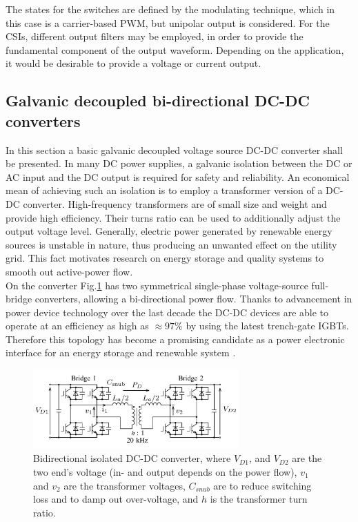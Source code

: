 The states for the switches are defined by the modulating technique, which in this case is a carrier-based PWM, but unipolar output is considered. For the CSIs, different output filters may be employed, in order to provide the fundamental component of the output waveform. Depending on the application, it would be desirable to provide a voltage or current output.

\subsection{Galvanic decoupled bi-directional DC-DC converters}\label{BASICCSR:sec:DCDC}

In this section a basic galvanic decoupled voltage source DC-DC converter shall be presented. In many DC power supplies, a galvanic isolation between the DC or AC input and the DC output is required for safety and reliability. An economical mean of achieving such an isolation is to employ a transformer version of a DC-DC converter. High-frequency transformers are of small size and weight and provide high efficiency. Their turns ratio can be used to additionally adjust the output voltage level. Generally, electric power generated by renewable energy sources is unstable in nature, thus producing an unwanted effect on the utility grid. This fact motivates research on energy storage and quality systems to smooth out active-power flow.\\
On the converter Fig.\ref{BASICCSR:fig:DCDCGalvanic} has two symmetrical single-phase voltage-source full-bridge converters, allowing a bi-directional power flow. Thanks to advancement in power device technology over the last decade the DC-DC devices are able to operate at an efficiency as high as $\approx97\%$ by using the latest trench-gate IGBTs. Therefore this topology has become a promising candidate as a power electronic interface for an energy storage and renewable system \cite{kheraluwala1992performance} \cite{inoue2007bidirectional}.


\begin{figure}[!ht]
        \centering
        \includegraphics[width=0.7\textwidth]{EMPC_PNG_Pics/DC_DC_galvanic.png}
        \caption{Bidirectional isolated DC-DC converter, where $V_{D1}$, and $V_{D2}$ are the two end's voltage (in- and output depends on the power flow), $v_1$ and $v_2$ are the transformer voltages, $C_{snub}$ are to reduce switching loss and to damp out
over-voltage, and $h$ is the transformer turn ratio.}
        \label{BASICCSR:fig:DCDCGalvanic}
    \end{figure}
		
